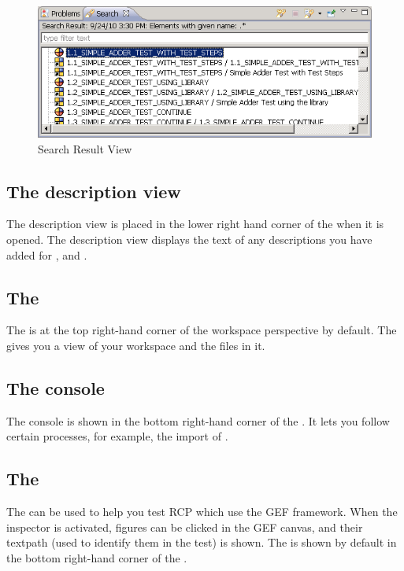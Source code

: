 \begin{figure}[hbtp]
\begin{center}
\includegraphics{Userinterface/Editors/PS/showresultview}
\caption{Search Result View}
\label{showresultview}
\end{center}
\end{figure}

\subsection{The description view}
The description view is placed in the lower right hand corner of the \specpersp{} when it is opened. The description view displays the text of any descriptions you have added for \gdcases{}, \gdsuites{} and \gdjobs{}. 

\subsection{The \gdnavview{}}
\protect{}
The \gdnavview{} is at the top right-hand corner of the workspace perspective by default. The \gdnavview{} gives you a view of your workspace and the files in it. 


\subsection{The console}
The console is shown in the bottom right-hand corner of the \specpersp{}. It lets you follow certain processes, for example, the import of \gdprojects{}.  

\subsection{The \gdinspector{}}
The \gdinspector{} can be used to help you test RCP \gdauts{} which use the GEF framework. When the inspector is activated, figures can be clicked in the GEF canvas, and their textpath (used to identify them in the test) is shown. The \gdinspector{} is shown by default in the bottom right-hand corner of the \specpersp{}. 

